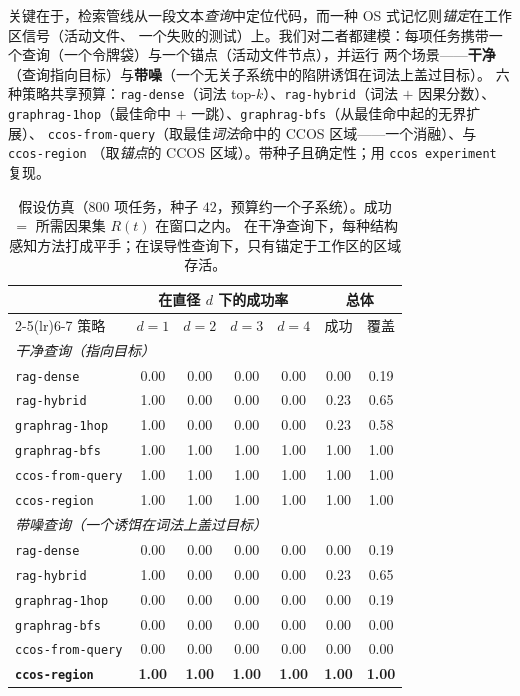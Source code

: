 \documentclass[11pt]{ctexart}
\newcommand{\code}[1]{\texttt{#1}}
\begin{document}
关键在于，检索管线从一段文本\emph{查询}中定位代码，而一种 OS 式记忆则\emph{锚定}在工作区信号（活动文件、
一个失败的测试）上。我们对二者都建模：每项任务携带一个查询（一个令牌袋）与一个锚点（活动文件节点），并运行
两个场景——\textbf{干净}（查询指向目标）与\textbf{带噪}（一个无关子系统中的陷阱诱饵在词法上盖过目标）。
六种策略共享预算：\code{rag-dense}（词法 top-$k$）、\code{rag-hybrid}（词法 $+$ 因果分数）、
\code{graphrag-1hop}（最佳命中 $+$ 一跳）、\code{graphrag-bfs}（从最佳命中起的无界扩展）、
\code{ccos-from-query}（取最佳\emph{词法}命中的 CCOS 区域——一个消融）、与 \code{ccos-region}
（取\emph{锚点}的 CCOS 区域）。带种子且确定性；用 \code{ccos experiment} 复现。

\begin{table}[h]
\centering
\begin{tabular}{lcccccc}
\toprule
& \multicolumn{4}{c}{在直径 $d$ 下的成功率} & \multicolumn{2}{c}{总体} \\
\cmidrule(lr){2-5}\cmidrule(lr){6-7}
策略 & $d{=}1$ & $d{=}2$ & $d{=}3$ & $d{=}4$ & 成功 & 覆盖 \\
\midrule
\multicolumn{7}{l}{\emph{干净查询（指向目标）}}\\
\code{rag-dense}      & 0.00 & 0.00 & 0.00 & 0.00 & 0.00 & 0.19 \\
\code{rag-hybrid}     & 1.00 & 0.00 & 0.00 & 0.00 & 0.23 & 0.65 \\
\code{graphrag-1hop}  & 1.00 & 0.00 & 0.00 & 0.00 & 0.23 & 0.58 \\
\code{graphrag-bfs}   & 1.00 & 1.00 & 1.00 & 1.00 & 1.00 & 1.00 \\
\code{ccos-from-query}& 1.00 & 1.00 & 1.00 & 1.00 & 1.00 & 1.00 \\
\code{ccos-region}    & 1.00 & 1.00 & 1.00 & 1.00 & 1.00 & 1.00 \\
\midrule
\multicolumn{7}{l}{\emph{带噪查询（一个诱饵在词法上盖过目标）}}\\
\code{rag-dense}      & 0.00 & 0.00 & 0.00 & 0.00 & 0.00 & 0.19 \\
\code{rag-hybrid}     & 1.00 & 0.00 & 0.00 & 0.00 & 0.23 & 0.65 \\
\code{graphrag-1hop}  & 0.00 & 0.00 & 0.00 & 0.00 & 0.00 & 0.19 \\
\code{graphrag-bfs}   & 0.00 & 0.00 & 0.00 & 0.00 & 0.00 & 0.00 \\
\code{ccos-from-query}& 0.00 & 0.00 & 0.00 & 0.00 & 0.00 & 0.00 \\
\textbf{\code{ccos-region}} & \textbf{1.00} & \textbf{1.00} & \textbf{1.00} & \textbf{1.00} & \textbf{1.00} & \textbf{1.00} \\
\bottomrule
\end{tabular}
\caption{假设仿真（$800$ 项任务，种子 $42$，预算约一个子系统）。成功 $=$ 所需因果集 $R(t)$ 在窗口之内。
在干净查询下，每种结构感知方法打成平手；在误导性查询下，只有锚定于工作区的区域存活。}
\label{tab:sim}
\end{table}
\end{document}
